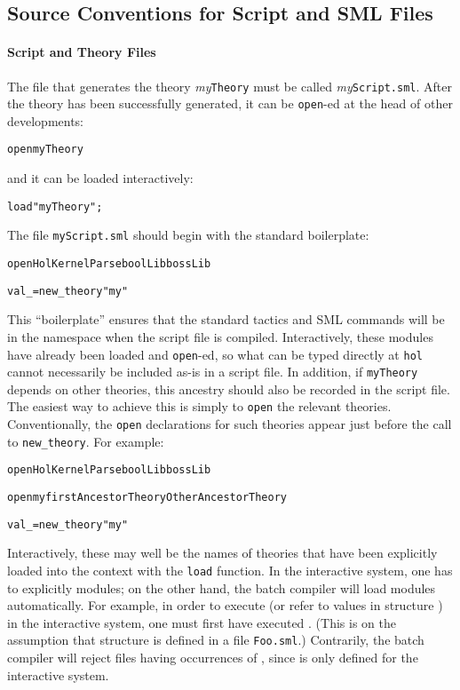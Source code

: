 \subsection{Source Conventions for Script and SML Files}

\paragraph{Script and Theory Files}
The file that generates the \HOL{} theory \textit{my}\texttt{Theory} must be called \textit{my}\texttt{Script.sml}.
After the theory has been successfully generated, it can be \texttt{open}-ed at the head of other developments:
\begin{alltt}
    open myTheory
\end{alltt}
and it can be loaded interactively:
\begin{alltt}
    load "myTheory";
\end{alltt}
The file \texttt{myScript.sml} should begin with the standard boilerplate:
\begin{alltt}
    open HolKernel Parse boolLib bossLib

    val _ = new_theory "my"
\end{alltt}
This ``boilerplate'' ensures that the standard tactics and SML commands will be in the namespace when the script file is compiled.
Interactively, these modules have already been loaded and \texttt{open}-ed, so what can be typed directly at \texttt{hol} cannot necessarily be included as-is in a script file.
In addition, if \texttt{myTheory} depends on other \HOL{} theories, this ancestry should also be recorded in the script file.
The easiest way to achieve this is simply to \texttt{open} the relevant theories.
Conventionally, the \texttt{open} declarations for such theories appear just before the call to \texttt{new_theory}.
For example:
\begin{alltt}
    open HolKernel Parse boolLib bossLib

    open myfirstAncestorTheory OtherAncestorTheory

    val _ = new_theory "my"
\end{alltt}
Interactively, these may well be the names of theories that have been explicitly loaded into the context with the \texttt{load} function.
In the interactive system, one has to explicitly  modules; on the other hand, the batch compiler will load modules automatically.
For example, in order to execute  (or refer to values in structure ) in the interactive system, one must first have executed .
(This is on the assumption that structure  is defined in a file \texttt{Foo.sml}.)
Contrarily, the batch compiler will reject files having occurrences of , since  is only defined for the interactive system.

